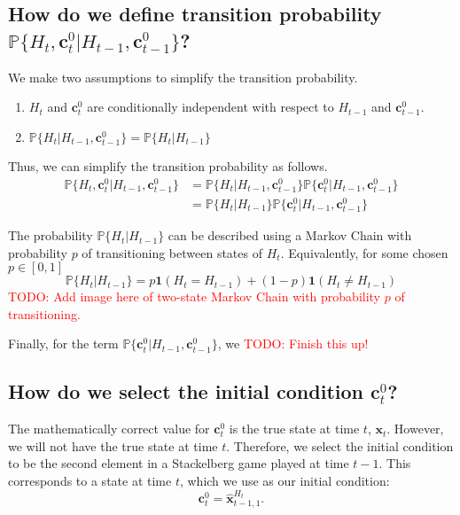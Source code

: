 \documentclass[11pt]{article}
\newcommand\truestate[1]{\bm{x}_{#1}}
\newcommand\prob[1]{\mathbb{P}{\{#1\}}}
\newcommand\stackmeas[2]{\bm{\hat{x}}^{#1}_{#2}}
\newcommand\initcond[1]{\bm{c}^{0}_{#1}}
\newcommand\todo[1]{\textcolor{red}{TODO: #1}}
\begin{document}
\subsection{How do we define transition probability $\prob{H_t, \initcond{t} | H_{t-1}, \initcond{t-1}}$?}
We make two assumptions to simplify the transition probability.
\begin{enumerate}
\item $H_t$ and $\initcond{t}$ are conditionally independent with respect to $H_{t-1}$ and $\initcond{t-1}$.
\item $\prob{H_t | H_{t-1}, \initcond{t-1}} = \prob{H_t | H_{t-1}}$
\end{enumerate}
Thus, we can simplify the transition probability as follows.
\begin{align}
\label{eq:simplified-transition-prob}
\prob{H_t, \initcond{t} | H_{t-1}, \initcond{t-1}} &= \prob{H_t | H_{t-1}, \initcond{t-1}} \prob{\initcond{t} | H_{t-1}, \initcond{t-1}} \\
    &= \prob{H_t | H_{t-1}} \prob{\initcond{t} | H_{t-1}, \initcond{t-1}}
\end{align}

The probability $\prob{H_t | H_{t-1}}$ can be described using a Markov Chain with probability $p$ of transitioning between states of $H_t$. Equivalently, for some chosen $p \in [0, 1]$
\begin{equation}
\label{eq:lead-state-transition}
\prob{H_t | H_{t-1}} = p \bm{1}(H_t = H_{t-1}) + (1-p) \bm{1}(H_t \neq H_{t-1})
\end{equation}
\todo{Add image here of two-state Markov Chain with probability $p$ of transitioning.}


Finally, for the term $\prob{\initcond{t} | H_{t-1}, \initcond{t-1}}$, we \todo{Finish this up!}


\subsection{How do we select the initial condition $\initcond{t}$?}
The mathematically correct value for $\initcond{t}$ is the true state at time $t$, $\truestate{t}$. However, we will not have the true state at time $t$. Therefore, we select the initial condition to be the second element in a Stackelberg game played at time $t-1$. This corresponds to a state at time $t$, which we use as our initial condition:
\begin{equation}
\initcond{t} = \stackmeas{H_t}{t-1, 1}.
\end{equation}
\end{document}
